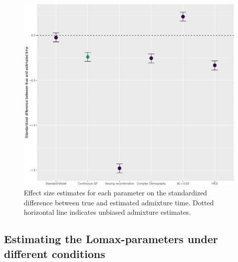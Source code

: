\documentclass[]{article}
\begin{document}
\begin{figure}
\centering
\includegraphics{Admixture_Time_Inference_Paper_Draft_files/figure-latex/fig3-1.pdf}
\caption{\label{fig:fig3} Effect size estimates for each parameter on the standardized difference between true and estimated admixture time. Dotted horizontal line indicates unbiased admixture estimates.}
\end{figure}

\subsection{Estimating the Lomax-parameters under different conditions}\label{estimating the Lomax-parameters under different conditions}
\end{document}
